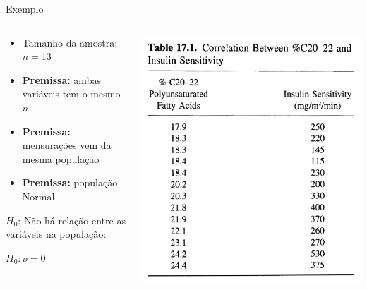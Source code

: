 \documentclass{beamer}
\begin{document}
\begin{frame}{Exemplo}
  \begin{columns}
    \begin{column}{5cm}
      \begin{itemize}
        \footnotesize
      \item Tamanho da amostra: $n=13$
      \bigskip
      \item {\bf Premissa:} ambas variáveis tem o mesmo $n$
      \item {\bf Premissa:} mensurações vem da mesma população
      \item {\bf Premissa:} população Normal
      \end{itemize}
      \bigskip
      \begin{block}{}
        \footnotesize
        $H_0$: Não há relação entre as variáveis na população:

        \medskip
        $H_0: \rho = 0$
      \end{block}
    \end{column}
    \begin{column}{5cm}
      \includegraphics[height=0.8\textheight]{Cap17/table}
    \end{column}
  \end{columns}
\end{frame}
\end{document}

